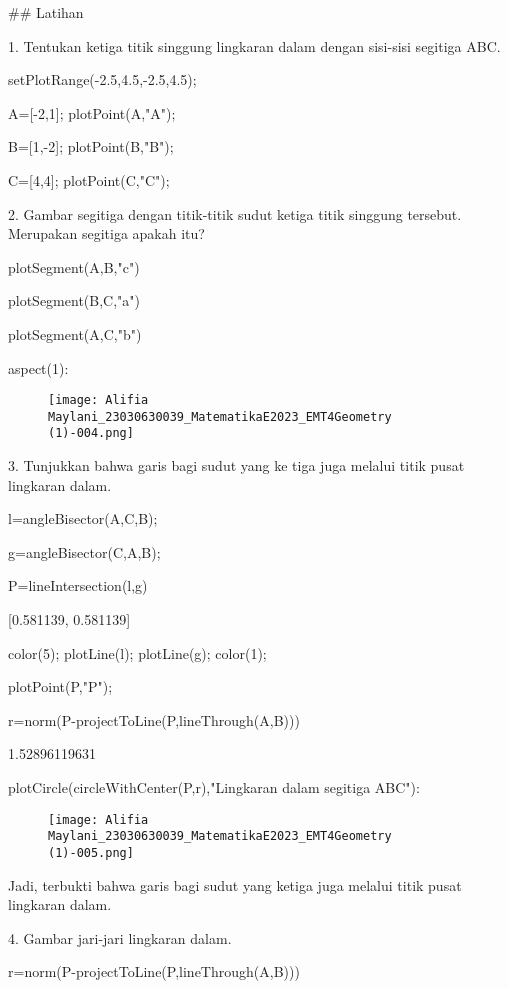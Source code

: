 \documentclass{article}
\begin{document}
## Latihan

1. Tentukan ketiga titik singgung lingkaran dalam dengan sisi-sisi
segitiga ABC.


\>setPlotRange(-2.5,4.5,-2.5,4.5);

\>A=[-2,1]; plotPoint(A,"A");

\>B=[1,-2]; plotPoint(B,"B");

\>C=[4,4]; plotPoint(C,"C");


2. Gambar segitiga dengan titik-titik sudut ketiga titik singgung
tersebut. Merupakan segitiga apakah itu?


\>plotSegment(A,B,"c")

\>plotSegment(B,C,"a")

\>plotSegment(A,C,"b")

\>aspect(1):


\begin{figure}
    \centering
    \texttt{[image: Alifia Maylani\_23030630039\_MatematikaE2023\_EMT4Geometry (1)-004.png]}
    \caption{}
    \label{fig:enter-label}
\end{figure}

3. Tunjukkan bahwa garis bagi sudut yang ke tiga juga melalui titik
pusat lingkaran dalam.


\>l=angleBisector(A,C,B);

\>g=angleBisector(C,A,B);

\>P=lineIntersection(l,g)


    [0.581139,  0.581139]

\>color(5); plotLine(l); plotLine(g); color(1);

\>plotPoint(P,"P");

\>r=norm(P-projectToLine(P,lineThrough(A,B)))


    1.52896119631

\>plotCircle(circleWithCenter(P,r),"Lingkaran dalam segitiga ABC"):


\begin{figure}
    \centering
    \texttt{[image: Alifia Maylani\_23030630039\_MatematikaE2023\_EMT4Geometry (1)-005.png]}
    \caption{}
    \label{fig:enter-label}
\end{figure}

Jadi, terbukti bahwa garis bagi sudut yang ketiga juga melalui titik
pusat lingkaran dalam.


4. Gambar jari-jari lingkaran dalam.


\>r=norm(P-projectToLine(P,lineThrough(A,B)))
\end{document}
